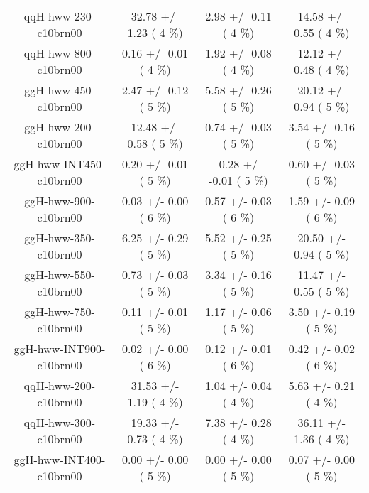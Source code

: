 \begin{table}[h!]
\begin{center}
{\begin{tabular}{
c| c | c | c | }
 qqH-hww-230-c10brn00   &      32.78 +/-       1.23 (         4 \%)   &       2.98 +/-       0.11 (         4 \%)   &      14.58 +/-       0.55 (         4 \%)  \\
 qqH-hww-800-c10brn00   &       0.16 +/-       0.01 (         4 \%)   &       1.92 +/-       0.08 (         4 \%)   &      12.12 +/-       0.48 (         4 \%)  \\
 ggH-hww-450-c10brn00   &       2.47 +/-       0.12 (         5 \%)   &       5.58 +/-       0.26 (         5 \%)   &      20.12 +/-       0.94 (         5 \%)  \\
 ggH-hww-200-c10brn00   &      12.48 +/-       0.58 (         5 \%)   &       0.74 +/-       0.03 (         5 \%)   &       3.54 +/-       0.16 (         5 \%)  \\
 ggH-hww-INT450-c10brn00   &       0.20 +/-       0.01 (         5 \%)   &      -0.28 +/-      -0.01 (         5 \%)   &       0.60 +/-       0.03 (         5 \%)  \\
 ggH-hww-900-c10brn00   &       0.03 +/-       0.00 (         6 \%)   &       0.57 +/-       0.03 (         6 \%)   &       1.59 +/-       0.09 (         6 \%)  \\
 ggH-hww-350-c10brn00   &       6.25 +/-       0.29 (         5 \%)   &       5.52 +/-       0.25 (         5 \%)   &      20.50 +/-       0.94 (         5 \%)  \\
 ggH-hww-550-c10brn00   &       0.73 +/-       0.03 (         5 \%)   &       3.34 +/-       0.16 (         5 \%)   &      11.47 +/-       0.55 (         5 \%)  \\
 ggH-hww-750-c10brn00   &       0.11 +/-       0.01 (         5 \%)   &       1.17 +/-       0.06 (         5 \%)   &       3.50 +/-       0.19 (         5 \%)  \\
 ggH-hww-INT900-c10brn00   &       0.02 +/-       0.00 (         6 \%)   &       0.12 +/-       0.01 (         6 \%)   &       0.42 +/-       0.02 (         6 \%)  \\
 qqH-hww-200-c10brn00   &      31.53 +/-       1.19 (         4 \%)   &       1.04 +/-       0.04 (         4 \%)   &       5.63 +/-       0.21 (         4 \%)  \\
 qqH-hww-300-c10brn00   &      19.33 +/-       0.73 (         4 \%)   &       7.38 +/-       0.28 (         4 \%)   &      36.11 +/-       1.36 (         4 \%)  \\
 ggH-hww-INT400-c10brn00   &       0.00 +/-       0.00 (         5 \%)   &       0.00 +/-       0.00 (         5 \%)   &       0.07 +/-       0.00 (         5 \%)  \\

\end{tabular}}
\end{center}
\end{table}
